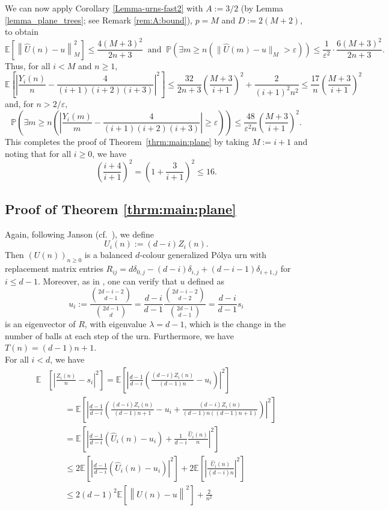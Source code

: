 \documentclass[12pt]{amsart}
\theoremstyle{definition}
\theoremstyle{remark}
\newcommand{\PP}{\mathbb{P}}
\newcommand{\EE}{\mathbb{E}}
\newcommand{\eps}{\varepsilon}
\begin{document}
We can now apply Corollary \ref{Lemma-urns-fast2} with $A:=3/2$ (by Lemma \ref{lemma_plane_trees}; see Remark \ref{rem:A:bound}), $p=M$ and $D:=2(M+2)$, to obtain
\[
\EE\left[ \left\| \hat{U}(n)-u\right\|_M^2 \right]\leq \frac{4(M+3)^2}{2n+3}\ \text{ and }\ \PP \left( \exists m\geq n \left( \|\hat{U}(m)-u\|_M>\eps\right)\right) \leq \frac{1}{\eps^2}\cdot\frac{6(M+3)^2}{2n+3}  .
\]
Thus, for all $i<M$ and $n\geq 1$,
\[
\EE\left[ \left| \frac{Y_i(n)}{n} - \frac{4}{(i+1)(i+2)(i+3)} \right|^2 \right]\leq \frac{32}{2n+3}\left(\frac{M+3}{i+1}\right)^2 + \frac{2}{(i+1)^2n^2}\leq \frac{17}{n}\left(\frac{M+3}{i+1}\right)^2
\]
and, for $n>2/\eps$,
\[
\PP\left( \exists m\geq  n \left( \left|\frac{Y_i(m)}{m} - \frac{4}{(i+1)(i+2)(i+3)}\right|\geq \eps \right) \right)\leq \frac{48}{\eps^2n}\left(\frac{M+3}{i+1}\right)^2.
\]
This completes the proof of Theorem~\ref{thrm:main:plane} by taking $M:=i+1$ and noting that for all $i \ge 0$, we have 
\[
\left(\frac{i+4}{i+1}\right)^2= \left(1+\frac{3}{i+1}\right)^2\le 16.
\]

\subsection{Proof of Theorem \ref{thrm:main:plane}}
Again, following Janson (cf.\ \cite[Section 6]{janson2005asymptotic}), we define
\[
U_i(n) := (d-i)Z_i(n).
\]
Then  $(U(n))_{n \geq 0}$ is a balanced $d$-colour generalized P\'{o}lya urn with replacement matrix entries
$R_{ij} = d\delta_{0,j} -(d-i)\delta_{i,j}+(d-i-1)\delta_{i+1,j}$ for $i \leq d-1$. Moreover, as in \cite{janson2005asymptotic}, one can verify that $u$ defined as 
 \[
u_i := \frac{\binom{2d-i-2}{d-1}}{\binom{2d-1}{d}} = \frac{d-i}{d-1}\frac{\binom{2d-i-2}{d-2}}{\binom{2d-1}{d-1}} = \frac{d-i}{d-1}s_i
\]
is an eigenvector of $R$, with eigenvalue $\lambda = d-1$, which is the change in the number of balls at each step of the urn. Furthermore, we have $T(n)=(d-1)n+1$.\\

For all $i<d$, we have
\begin{align*}
    \EE&\left[ \left| \frac{Z_i(n)}{n} - s_i \right|^2 \right]= \EE\left[ \left| \frac{d-1}{d-i}\left( \frac{(d-i)Z_i(n)}{(d-1)n} - u_i \right) \right|^2 \right]\\
    &\qquad = \EE\left[ \left| \frac{d-1}{d-i}\left(\frac{(d-i)Z_i(n)}{(d-1)n+1} - u_i + \frac{(d-i)Z_i(n)}{(d-1)n((d-1)n+1)} \right) \right|^2 \right]\\
    &\qquad = \EE\left[ \left|\frac{d-1}{d-i}\left( \hat{U}_i(n) -u_i \right) + \frac{1}{d-i}\frac{\hat{U}_i(n)}{n} \right|^2 \right]\\
    &\qquad \leq 2\EE\left[ \left| \frac{d-1}{d-i}\left( \hat{U}_i(n) -u_i\right) \right|^2 \right] + 2\EE\left[ \left| \frac{\hat{U}_i(n)}{(d-i)n} \right|^2 \right]\\
    &\qquad \leq 2\left(d-1\right)^2\EE\left[ \left\| \hat{U}(n) - u \right\|^2 \right] + \frac{2}{n^2}
\end{align*}
\end{document}
